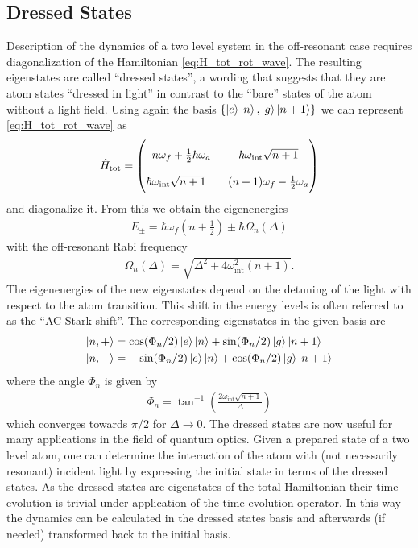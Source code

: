 \subsection{Dressed States}
\label{sec:DressedStates}
Description of the dynamics of a two level system in the
off-resonant case requires diagonalization of the Hamiltonian
\eqref{eq:H_tot_rot_wave}. The resulting eigenstates are called ``dressed
states'', a wording that suggests that they are atom states ``dressed in light'' in contrast
to the ``bare'' states of the atom without a light field. Using again the basis
$\left\lbrace \ket{e}\ket{n}, \ket{g}\ket{n+1}\right\rbrace$ we can represent
\eqref{eq:H_tot_rot_wave} as
\begin{align}
  \label{eq:H_tot_matrix}
  \hat{H}_{\text{tot}} = 
  \renewcommand*{\arraystretch}{2}
  \begin{pmatrix*}[c]
    n\omega_f + \frac{1}{2} \hbar\omega_a & \hbar\omega_{\text{int}} \sqrt{n+1}\\
    \hbar\omega_{\text{int}} \sqrt{n+1}\quad & (n+1)\omega_f - \frac{1}{2}\omega_a
  \end{pmatrix*}
\end{align}
and diagonalize it. From this we obtain the eigenenergies 
\begin{align}
  \label{eq:eigenergies}
  E_\pm = \hbar\omega_f\left(n+\frac{1}{2}\right) \pm \hbar\Omega_n(\Delta)
\end{align}
with the off-resonant Rabi frequency
\begin{align}
  \label{eq:Omega_n}
  \Omega_n(\Delta) = \sqrt{\Delta^2 + 4 \omega_{\text{int}}^2(n+1)}.
\end{align}
The eigenenergies of the new eigenstates depend on the detuning of the light
with respect to the atom transition. This shift in the energy levels is often
referred to as the ``AC-Stark-shift''.
The corresponding eigenstates in the given basis are
\begin{align}
  \label{eq:eigenstates}
  \ket{n,+} &=  \cos(\Phi_n/2)\ket{e}\ket{n} +  \sin(\Phi_n/2) \ket{g}\ket{n+1}\\ 
  \ket{n,-} &=  -\sin(\Phi_n/2)\ket{e}\ket{n} +  \cos(\Phi_n/2) \ket{g}\ket{n+1} 
\end{align}
where the angle $\Phi_n$ is given by
\begin{align}
  \label{eq:phi_n}
  \Phi_n = \tan^{-1}\left( \frac{2\omega_{\text{int}}\sqrt{n+1}}{\Delta} \right)
\end{align}
which converges towards $\pi/2$ for $\Delta\rightarrow 0$. The dressed states
are now useful for many applications in the field of quantum optics. Given a
prepared state of a two level atom, one can determine the interaction of the
atom with (not necessarily resonant) incident light by expressing the initial
state in terms of the dressed states. As the dressed states are eigenstates of
the total Hamiltonian their time evolution is trivial under application of the
time evolution operator. In this way the dynamics can be calculated in the
dressed states basis and afterwards (if needed) transformed back to the initial
basis.

